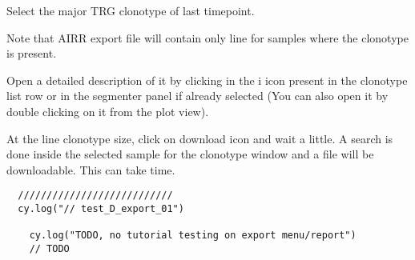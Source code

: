 Select the major TRG clonotype of last timepoint.

Note that AIRR export file will contain only line for samples where the clonotype is present.



Open a detailed description of it by clicking in the {i icon} present in the clonotype list row or in the segmenter panel if already selected (You can also open it by double clicking on it from the plot view).


At the line clonotype size, click on download icon and wait a little. 
A search is done inside the selected sample for the clonotype window and a file will be downloadable. 
This can take time. 

\begin{verbatim}
  ///////////////////////////
  cy.log("// test_D_export_01")

    cy.log("TODO, no tutorial testing on export menu/report")
    // TODO

\end{verbatim}
